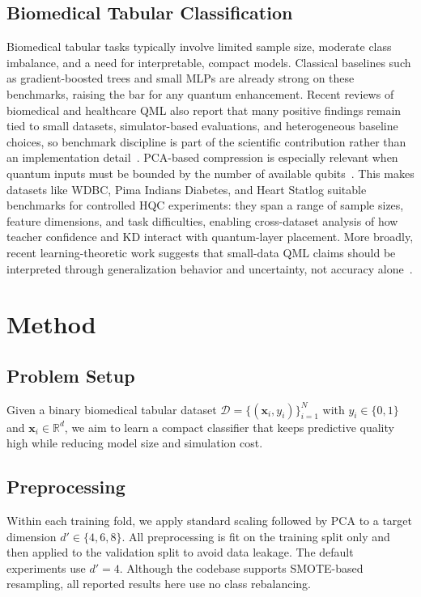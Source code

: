 \documentclass[11pt,a4paper]{article}
\begin{document}
\subsection{Biomedical Tabular Classification}
Biomedical tabular tasks typically involve limited sample size, moderate class imbalance, and a need
for interpretable, compact models. Classical baselines such as gradient-boosted trees and small MLPs
are already strong on these benchmarks, raising the bar for any quantum enhancement. Recent reviews
of biomedical and healthcare QML also report that many positive findings remain tied to small
datasets, simulator-based evaluations, and heterogeneous baseline choices, so benchmark discipline is
part of the scientific contribution rather than an implementation detail~\cite{maheshwari2022biomedical,gupta2025digitalhealth}.
PCA-based compression is especially relevant when quantum inputs must be bounded by the number of
available qubits~\cite{sagingalieva2023hyperparameter}. This makes datasets like WDBC, Pima Indians
Diabetes, and Heart Statlog suitable benchmarks for controlled HQC experiments: they span a range of
sample sizes, feature dimensions, and task difficulties, enabling cross-dataset analysis of how
teacher confidence and KD interact with quantum-layer placement. More broadly, recent
learning-theoretic work suggests that small-data QML claims should be interpreted through
generalization behavior and uncertainty, not accuracy alone~\cite{caro2022generalization}.

\section{Method}
\label{sec:method}

\subsection{Problem Setup}
Given a binary biomedical tabular dataset $\mathcal{D}=\{(\mathbf{x}_i, y_i)\}_{i=1}^{N}$ with
$y_i \in \{0,1\}$ and $\mathbf{x}_i \in \mathbb{R}^d$, we aim to learn a compact classifier that
keeps predictive quality high while reducing model size and simulation cost.

\subsection{Preprocessing}
Within each training fold, we apply standard scaling followed by PCA to a target dimension
$d' \in \{4,6,8\}$. All preprocessing is fit on the training split only and then applied to the
validation split to avoid data leakage. The default experiments use $d'=4$. Although the codebase
supports SMOTE-based resampling, all reported results here use no class rebalancing.
\end{document}
